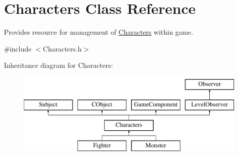 \hypertarget{class_characters}{}\section{Characters Class Reference}
\label{class_characters}


Provides resource for management of \hyperlink{class_characters}{Characters} within game.  




{\ttfamily \#include $<$Characters.\+h$>$}

Inheritance diagram for Characters\+:\begin{figure}[H]
\begin{center}
\leavevmode
\includegraphics[height=4.000000cm]{class_characters}
\end{center}
\end{figure}
